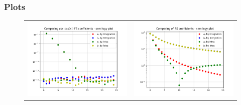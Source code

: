 \documentclass[11pt, a4paper, twoside]{article}
\begin{document}
            \subsubsection{Plots}
                \begin{figure}[H]
                    \begin{tabular}{cc}
                        \includegraphics[scale=0.5]{Plots/Figure 3.1.png} &
                        \includegraphics[scale=0.5]{Plots/Figure 4.1.png}\\

\end{tabular}
\end{figure}
\end{document}
